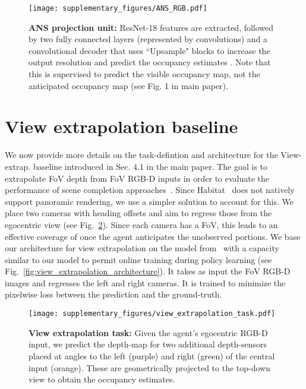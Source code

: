 \documentclass[runningheads]{llncs}
\begin{document}
\begin{figure}[ht!]
    \centering
    \texttt{[image: supplementary\_figures/ANS\_RGB.pdf]}
    \caption{\small \textbf{ANS projection unit:} ResNet-18 features are extracted, followed by two fully connected layers (represented by  convolutions) and a convolutional decoder that uses ``Upsample" blocks to increase the output resolution and predict the occupancy estimates . Note that this is supervised to predict the visible occupancy map, not the anticipated occupancy map (see Fig. 1 in main paper).}
    \label{fig:ans_projection_unit}
\end{figure}


\section{View extrapolation baseline}
\label{sec:view_extrapolation_baseline}
We now provide more details on the task-defintion and architecture for the View-extrap. baseline introduced in Sec. 4.1 in the main paper. The goal is to extrapolate  FoV depth from  FoV RGB-D inputs in order to evaluate the performance of scene completion approaches~\cite{song2018im2pano3d,Yang_2019_CVPR}. Since Habitat~\cite{habitat19iccv} does not natively support panoramic rendering, we use a simpler solution to account for this. We place two cameras with  heading offsets and aim to regress those from the egocentric view (see Fig.~\ref{fig:view_extrapolation_task}). Since each camera has a  FoV, this leads to an effective coverage of  once the agent anticipates the unobserved portions. We base our architecture for view extrapolation on the model from~\cite{Yang_2019_CVPR} with a capacity similar to our model to permit online training during policy learning (see Fig.~\ref{fig:view_extrapolation_architecture}). It takes as input the  FoV RGB-D images and regresses the left and right cameras. It is trained to minimize the pixelwise  loss between the prediction and the ground-truth.

\begin{figure}[ht!]
    \centering
    \texttt{[image: supplementary\_figures/view\_extrapolation\_task.pdf]}
    \caption{\small \textbf{View extrapolation task:} Given the agent's egocentric RGB-D input, we predict the depth-map for two additional depth-sensors placed at  angles to the left (purple) and right (green) of the central input (orange). These are geometrically projected to the top-down view to obtain the occupancy estimates.}
    \label{fig:view_extrapolation_task}
\end{figure}
\end{document}
